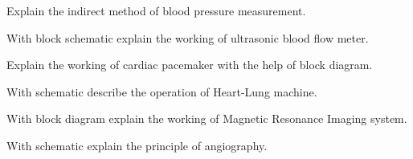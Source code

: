 \item \iitem Explain the indirect method of blood pressure measurement.
\Or
\item With block schematic explain the working of ultrasonic blood flow meter.
\ene

\item \iitem Explain the working of cardiac pacemaker with the help of block diagram.
\Or
\item With schematic describe the operation of Heart-Lung machine.
\ene

\item \iitem With block diagram explain the working of Magnetic Resonance Imaging system.
\Or
\item With schematic explain the principle of angiography.
\ene

\markC
\ene

